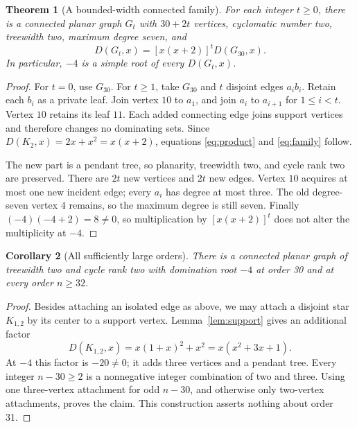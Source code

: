 \documentclass[11pt]{article}
\numberwithin{equation}{section}
\newtheorem{theorem}{Theorem}[section]
\newtheorem{corollary}[theorem]{Corollary}
\theoremstyle{definition}
\newcommand{\D}{D}
\newcommand{\Gthirty}{G_{30}}
\begin{document}
\begin{theorem}[A bounded-width connected family]\label{thm:family}
For each integer \(t\ge0\), there is a connected planar graph \(G_t\)
with \(30+2t\) vertices, cyclomatic number two, treewidth two, maximum
degree seven, and
\begin{equation}\label{eq:family}
 \D(G_t,x)=[x(x+2)]^t\D(\Gthirty,x).
\end{equation}
In particular, \(-4\) is a simple root of every \(\D(G_t,x)\).
\end{theorem}
\begin{proof}
For \(t=0\), use \(\Gthirty\). For \(t\ge1\), take \(\Gthirty\) and
\(t\) disjoint edges \(a_i b_i\). Retain each
\(b_i\) as a private leaf. Join vertex \(10\) to \(a_1\), and join
\(a_i\) to \(a_{i+1}\) for \(1\le i<t\). Vertex \(10\) retains its
leaf \(11\). Each added connecting edge joins support vertices and
therefore changes no dominating sets. Since
\(\D(K_2,x)=2x+x^2=x(x+2)\), equations
\eqref{eq:product} and \eqref{eq:family} follow.

The new part is a pendant tree, so planarity, treewidth two, and cycle
rank two are preserved. There are \(2t\) new vertices and \(2t\) new
edges. Vertex \(10\) acquires at most one new incident edge; every
\(a_i\) has degree at most three. The old degree-seven vertex \(4\)
remains, so the maximum degree is still seven. Finally
\((-4)(-4+2)=8\ne0\), so multiplication by \([x(x+2)]^t\) does not
alter the multiplicity at \(-4\).
\end{proof}

\begin{corollary}[All sufficiently large orders]\label{cor:orders}
There is a connected planar graph of treewidth two and cycle rank two
with domination root \(-4\) at order 30 and at every order \(n\ge32\).
\end{corollary}
\begin{proof}
Besides attaching an isolated edge as above, we may attach a disjoint
star \(K_{1,2}\) by its center to a support vertex. Lemma~\ref{lem:support}
gives an additional factor
\[
 \D(K_{1,2},x)=x(1+x)^2+x^2=x(x^2+3x+1).
\]
At \(-4\) this factor is \(-20\ne0\); it adds three vertices and a
pendant tree. Every integer \(n-30\ge2\) is a nonnegative integer
combination of two and three. Using one three-vertex attachment for
odd \(n-30\), and otherwise only two-vertex attachments, proves the
claim. This construction asserts nothing about order 31.
\end{proof}
\end{document}
